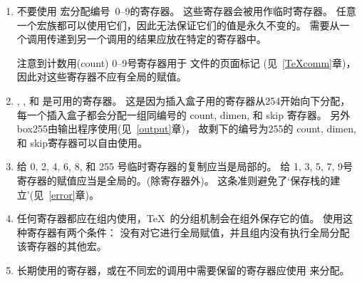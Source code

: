 \documentclass{book}
\begin{document}
\begin{enumerate}
\item 不要使用  宏分配编号~0--9的寄存器。
这些寄存器会被用作临时寄存器。
任意一个宏族都可以使用它们，因此无法保证它们的值是永久不变的。
需要从一个调用传递到另一个调用的结果应放在特定的寄存器中。

注意到计数用(count) 0--9号寄存器用于  文件的页面标记
(见~\ref{TeXcomm}章)，因此对这些寄存器不应有全局的赋值。

\item {}, , 和  是可用的寄存器。
这是因为插入盒子用的寄存器从254开始向下分配，
每一个插入盒子都会分配一组同编号的 count, dimen, 和 skip 寄存器。
另外box255由输出程序使用(见~\ref{output}章)，
故剩下的编号为255的 count, dimen, 和 skip寄存器可以自由使用。

\item 给 0, 2, 4, 6, 8, 和 255 号临时寄存器的复制应当是局部的。
给 1, 3, 5, 7, 9号寄存器的赋值应当是全局的。(除寄存器外)。
这条准则避免了‘保存栈的建立’(见~\ref{error}章)。

\item 任何寄存器都应在组内使用，\TeX\ 的分组机制会在组外保存它的值。
使用这种寄存器有两个条件：
没有对它进行全局赋值，并且组内没有执行全局分配该寄存器的其他宏。

\item 长期使用的寄存器，或在不同宏的调用中需要保留的寄存器应使用  来分配。
\end{enumerate}

\endofchapter
\end{document}
